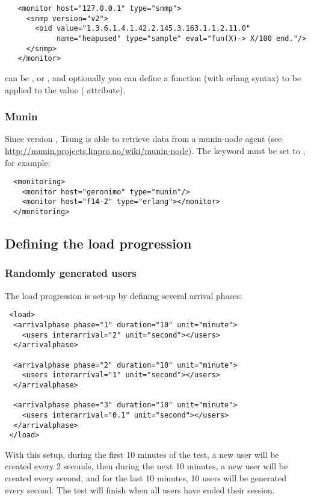 \documentclass{TSUNG-en}
\begin{document}
\begin{Verbatim}
   <monitor host="127.0.0.1" type="snmp">
     <snmp version="v2">
       <oid value="1.3.6.1.4.1.42.2.145.3.163.1.1.2.11.0"
            name="heapused" type="sample" eval="fun(X)-> X/100 end."/>
     </snmp>
   </monitor>
\end{Verbatim}

 can be ,  or
, and optionally you can define a function (with erlang
syntax) to be applied to the value ( attribute).

\subsubsection{Munin}

Since version , Tsung is able to retrieve data from a munin-node agent
(see \url{http://munin.projects.linpro.no/wiki/munin-node}). The 
keyword must be set to , for example:

\begin{Verbatim}
  <monitoring>
    <monitor host="geronimo" type="munin"/>
    <monitor host="f14-2" type="erlang"></monitor>
  </monitoring>
\end{Verbatim}

\subsection{Defining the load progression}

\subsubsection{Randomly generated users}

The load progression is set-up by defining several arrival phases:

\begin{Verbatim}
 <load>
  <arrivalphase phase="1" duration="10" unit="minute">
    <users interarrival="2" unit="second"></users>
  </arrivalphase>

  <arrivalphase phase="2" duration="10" unit="minute">
    <users interarrival="1" unit="second"></users>
  </arrivalphase>

  <arrivalphase phase="3" duration="10" unit="minute">
    <users interarrival="0.1" unit="second"></users>
  </arrivalphase>
 </load>
\end{Verbatim}

With this setup, during the first 10 minutes of the test, a new user
will be created every 2 seconds, then during the next 10 minutes, a
new user will be created every second, and for the last 10 minutes,
10 users will be generated every second. The test will finish when
all users have ended their session.
\end{document}
